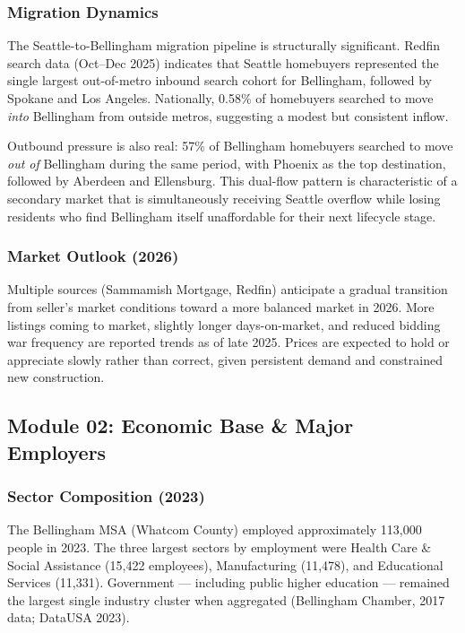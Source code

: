 \documentclass[11pt,letterpaper]{article}
\begin{document}
\subsubsection{Migration Dynamics}

The Seattle-to-Bellingham migration pipeline is structurally significant. Redfin search data (Oct--Dec 2025) indicates that Seattle homebuyers represented the single largest out-of-metro inbound search cohort for Bellingham, followed by Spokane and Los Angeles. Nationally, 0.58\% of homebuyers searched to move \emph{into} Bellingham from outside metros, suggesting a modest but consistent inflow.

Outbound pressure is also real: 57\% of Bellingham homebuyers searched to move \emph{out of} Bellingham during the same period, with Phoenix as the top destination, followed by Aberdeen and Ellensburg. This dual-flow pattern is characteristic of a secondary market that is simultaneously receiving Seattle overflow while losing residents who find Bellingham itself unaffordable for their next lifecycle stage.

\subsubsection{Market Outlook (2026)}

Multiple sources (Sammamish Mortgage, Redfin) anticipate a gradual transition from seller's market conditions toward a more balanced market in 2026. More listings coming to market, slightly longer days-on-market, and reduced bidding war frequency are reported trends as of late 2025. Prices are expected to hold or appreciate slowly rather than correct, given persistent demand and constrained new construction.

\subsection{Module 02: Economic Base \& Major Employers}

\subsubsection{Sector Composition (2023)}

The Bellingham MSA (Whatcom County) employed approximately 113,000 people in 2023. The three largest sectors by employment were Health Care \& Social Assistance (15,422 employees), Manufacturing (11,478), and Educational Services (11,331). Government --- including public higher education --- remained the largest single industry cluster when aggregated (Bellingham Chamber, 2017 data; DataUSA 2023).
\end{document}
